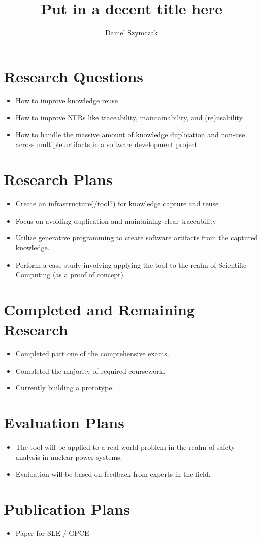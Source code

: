 \documentclass[11pt]{article} %
\title{Put in a decent title here}
\author{Daniel Szymczak}
\begin{document}
\maketitle

\section{Research Questions}

\begin{itemize}
	\item How to improve knowledge reuse
	\item How to improve NFRs like traceability, maintainability, and (re)usability
	\item How to handle the massive amount of knowledge duplication and non-use
					across multiple artifacts in a software development project
\end{itemize}

\section{Research Plans}

\begin{itemize}
	\item Create an infrastructure(/tool?) for knowledge capture and reuse %
	\item Focus on avoiding duplication and maintaining clear traceability
	\item Utilize generative programming to create software artifacts from the
					captured knowledge.
	\item Perform a case study involving applying the tool to the realm of
					Scientific Computing (as a proof of concept).
\end{itemize}

\section{Completed and Remaining Research}
\begin{itemize}
	\item Completed part one of the comprehensive exams.
	\item Completed the majority of required coursework.
	\item Currently building a prototype.
	
\end{itemize}

\section{Evaluation Plans}
\begin{itemize}
	\item The tool will be applied to a real-world problem in the realm of safety
					analysis in nuclear power systems.
	\item Evaluation will be based on feedback from experts in the field.
\end{itemize}

\section{Publication Plans}
\begin{itemize}
	\item Paper for SLE / GPCE
\end{itemize}
\end{document}
